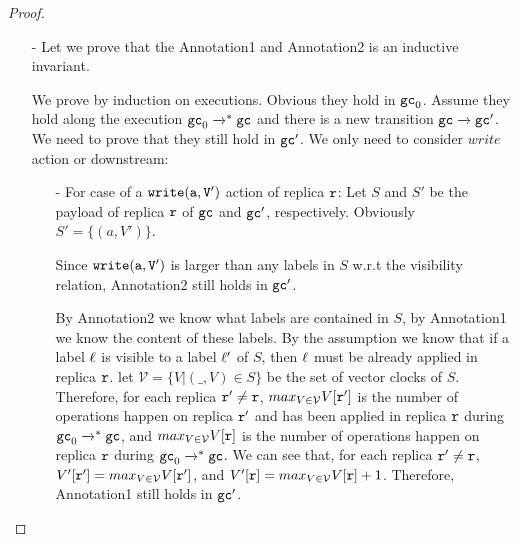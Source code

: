\begin {proof}
\begin{itemize}
In the process of obtaining $S'$ or $S''$ from $S$, we add $(a_1,V_1)$ and $(a_2,V_2)$ into $S$ and remove the following tuple $(a_3,V_3) \in S \cup \{(a_1,V_1),(a_2,V_2)\}$: either $V_3 < V_1$, or $V_3 < V_2$, or $(a_3,V_3) = (a_1,V_1) \wedge V_1 < V_2$, or $(a_3,V_3) = (a_2,V_2) \wedge V_2 < V_1$. Since we already know that $\alabelshort[{\tt write}]{a_1,V_1}$ and $\alabelshort[{\tt write}]{a_2,V_2}$ are concurrent, by  $fact_2$, we know that $\neg (V_1 < V_2 \vee V_2 < V_1)$. Therefore, $S' = S''$.


\item[-] Let we prove that the Annotation1 and Annotation2 is an inductive invariant.

We prove by induction on executions. Obvious they hold in $\mathtt{gc}_0$. Assume they hold along the execution $\mathtt{gc}_0 \xrightarrow{}^* \mathtt{gc}$ and there is a new transition $\mathtt{gc} \xrightarrow{} \mathtt{gc}'$. We need to prove that they still hold in $\mathtt{gc}'$. We only need to consider $write$ action or downstream:

    \begin{itemize}
    \setlength{\itemsep}{0.5pt}
    \item[-] For case of a $\alabelshort[{\tt write}]{a,V'}$ action of replica $\mathtt{r}$: Let $S$ and $S'$ be the payload of replica $\mathtt{r}$ of $\mathtt{gc}$ and $\mathtt{gc}'$, respectively. Obviously $S' = \{ (a,V') \}$.

        Since $\alabelshort[{\tt write}]{a,V'}$ is larger than any labels in $S$ w.r.t the visibility relation, Annotation2 still holds in $\mathtt{gc}'$.

        By Annotation2 we know what labels are contained in $S$, by Annotation1 we know the content of these labels. By the {} assumption we know that if a label $\ell$ is visible to a label $\ell'$ of $S$, then $\ell$ must be already applied in replica $\mathtt{r}$. let $\mathcal{V} = \{ V \vert (\_,V) \in S \}$ be the set of vector clocks of $S$. Therefore, for each replica $\mathtt{r}' \neq \mathtt{r}$, $max_{V \in \mathcal{V}} V[\mathtt{r}']$ is the number of operations happen on replica $\mathtt{r}'$ and has been applied in replica $\mathtt{r}$ during $\mathtt{gc}_0 \xrightarrow{}^* \mathtt{gc}$, and $max_{V \in \mathcal{V}} V[\mathtt{r}]$ is the number of operations happen on replica $\mathtt{r}$ during $\mathtt{gc}_0 \xrightarrow{}^* \mathtt{gc}$. We can see that, for each replica $\mathtt{r}' \neq \mathtt{r}$, $V'[\mathtt{r}'] = max_{V \in \mathcal{V}} V[\mathtt{r}']$, and $V'[\mathtt{r}] = max_{V \in \mathcal{V}} V[\mathtt{r}] +1$. Therefore, Annotation1 still holds in $\mathtt{gc}'$.


\end{itemize}
\end{itemize}
\end{proof}
